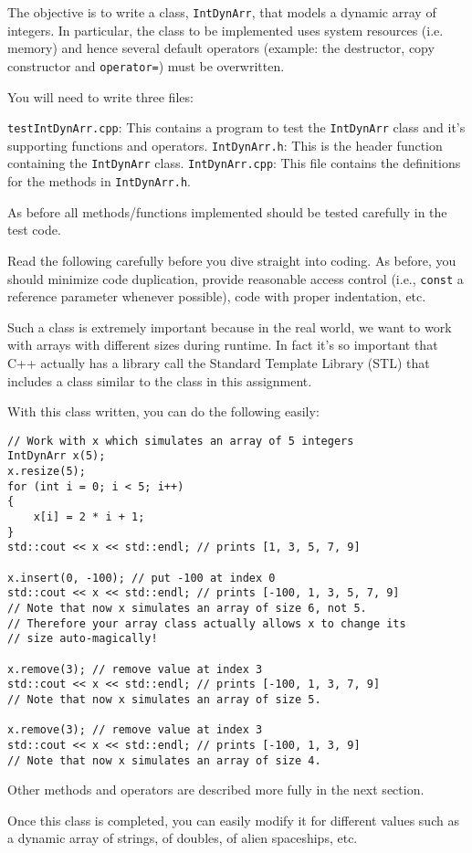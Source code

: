 The objective is to write a class, \verb!IntDynArr!, that 
models a dynamic array of integers. In particular, the class to 
be implemented uses system resources (i.e. memory) and hence several
default operators (example: the destructor, copy constructor and
\verb!operator=!) 
must be overwritten. 

You will need to write three files:
\begin{tightlist}
\li \verb!testIntDynArr.cpp!: This contains a program to test the \verb!IntDynArr! class 
and it's supporting functions and operators.
\li \verb!IntDynArr.h!: This is the header function containing the \verb!IntDynArr! class.
\li \verb!IntDynArr.cpp!: This file contains the definitions for the methods in 
\verb!IntDynArr.h!.
\end{tightlist}

As before all methods/functions implemented should be tested carefully in the 
test code. 

Read the following carefully before you dive straight into coding. As before, 
you should minimize code duplication, provide reasonable access control 
(i.e., \verb!const! a reference parameter whenever possible), code with proper 
indentation, etc. 

Such a class is extremely important because in the real world, we want to 
work with arrays with different sizes during runtime. In fact it's so important 
that C++ actually has a library call the Standard Template Library (STL) that 
includes a class similar to the class in this assignment. 

With this class written, you can do the following easily:
\begin{Verbatim}[frame=single]
// Work with x which simulates an array of 5 integers
IntDynArr x(5);
x.resize(5);
for (int i = 0; i < 5; i++)
{
    x[i] = 2 * i + 1;
}
std::cout << x << std::endl; // prints [1, 3, 5, 7, 9]

x.insert(0, -100); // put -100 at index 0
std::cout << x << std::endl; // prints [-100, 1, 3, 5, 7, 9]
// Note that now x simulates an array of size 6, not 5.
// Therefore your array class actually allows x to change its
// size auto-magically!

x.remove(3); // remove value at index 3
std::cout << x << std::endl; // prints [-100, 1, 3, 7, 9]
// Note that now x simulates an array of size 5.

x.remove(3); // remove value at index 3
std::cout << x << std::endl; // prints [-100, 1, 3, 9]
// Note that now x simulates an array of size 4.
\end{Verbatim}
Other methods and operators are described more fully in 
the next section. 

Once this class is completed, you can easily modify it for 
different values such as a dynamic array of strings, of 
doubles, of alien spaceships, etc.


